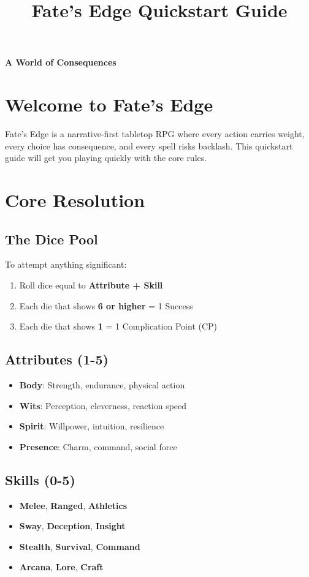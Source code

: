 \documentclass[11pt]{article}
\title{Fate's Edge Quickstart Guide}
\author{}
\date{}
\begin{document}
\maketitle

\begin{center}
\textbf{A World of Consequences}
\end{center}

\section{Welcome to Fate's Edge}

Fate's Edge is a narrative-first tabletop RPG where every action carries weight, every choice has consequence, and every spell risks backlash. This quickstart guide will get you playing quickly with the core rules.

\section{Core Resolution}

\subsection{The Dice Pool}
To attempt anything significant:
\begin{enumerate}
    \item Roll dice equal to \textbf{Attribute + Skill}
    \item Each die that shows \textbf{6 or higher} = 1 Success
    \item Each die that shows \textbf{1} = 1 Complication Point (CP)
\end{enumerate}

\subsection{Attributes (1-5)}
\begin{itemize}
    \item \textbf{Body}: Strength, endurance, physical action
    \item \textbf{Wits}: Perception, cleverness, reaction speed  
    \item \textbf{Spirit}: Willpower, intuition, resilience
    \item \textbf{Presence}: Charm, command, social force
\end{itemize}

\subsection{Skills (0-5)}
\begin{itemize}
    \item \textbf{Melee}, \textbf{Ranged}, \textbf{Athletics}
    \item \textbf{Sway}, \textbf{Deception}, \textbf{Insight}
    \item \textbf{Stealth}, \textbf{Survival}, \textbf{Command}
    \item \textbf{Arcana}, \textbf{Lore}, \textbf{Craft}
\end{itemize}
\end{document}
